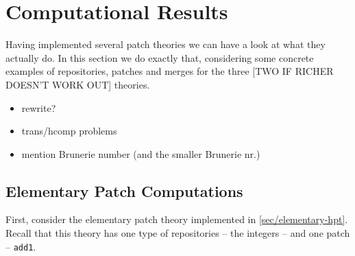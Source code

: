 \section{Computational Results}

Having implemented several patch theories we can have a look at what they actually do.
In this section we do exactly that, considering some concrete examples of repositories,
patches and merges for the three [TWO IF RICHER DOESN'T WORK OUT] theories.

\begin{itemize}
\item rewrite?
\item trans/hcomp problems
  \item mention Brunerie number (and the smaller Brunerie nr.)
\end{itemize}

\subsection{Elementary Patch Computations}

First, consider the elementary patch theory implemented in \autoref{sec/elementary-hpt}.
Recall that this theory has one type of repositories -- the integers -- and one patch
-- \texttt{add1}.

\begin{code}[hide]%
\>[0]\AgdaSymbol{\{-\#}\AgdaSpace{}%
\AgdaSpace{}%
\AgdaSpace{}%
\AgdaSpace{}%
\AgdaSymbol{\#-\}}\<%
\\
\>[0]\AgdaSpace{}%
\AgdaSpace{}%
\<%
\\
\>[0]\AgdaSpace{}%
\AgdaModule{\AgdaUnderscore{}}\AgdaSpace{}%
\<%
\\
\>[0][@{}l@{\AgdaIndent{0}}]%
\>[2]\AgdaSpace{}%
\AgdaSpace{}%
\<%
\\
%
\>[2]\AgdaSpace{}%
\AgdaSpace{}%
\<%
\\
%
\>[2]\AgdaSpace{}%
\AgdaSpace{}%
\<%
\\
%
\>[2]\AgdaSpace{}%
\AgdaSpace{}%
\<%
\end{code}

